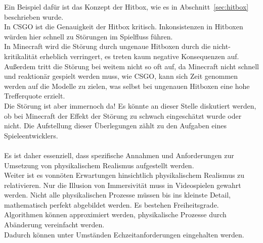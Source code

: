 Ein Beispiel dafür ist das Konzept der Hitbox, wie es in Abschnitt~\ref{sec:hitbox} beschrieben wurde.\\
In CSGO ist die Genauigkeit der Hitbox kritisch. Inkonsistenzen in Hitboxen würden hier schnell zu Störungen im Spielfluss führen.\\
In Minecraft wird die Störung durch ungenaue Hitboxen durch die nicht-kritikalität erheblich verringert, es treten kaum negative Konsequenzen auf. Außerdem tritt die Störung bei weitem nicht so oft auf, da Minecraft nicht schnell und reaktionär gespielt werden muss, wie CSGO, kann sich Zeit genommen werden auf die Modelle zu zielen, was selbst bei ungenauen Hitboxen eine hohe Trefferquote erzielt.\\
Die Störung ist aber immernoch da! Es könnte an dieser Stelle diskutiert werden, ob bei Minecraft der Effekt der Störung zu schwach eingeschätzt wurde oder nicht. Die Aufstellung dieser Überlegungen zählt zu den Aufgaben eines Spieleentwicklers.\\
\\
Es ist daher essenziell, dass spezifische Annahmen und Anforderungen zur Umsetzung von physikalischem Realismus aufgestellt werden.\\
Weiter ist es vonnöten Erwartungen hinsichtlich physikalischem Realismus zu relativieren. Nur die Illusion von Immersivität muss in Videospielen gewahrt werden. Nicht alle physikalischen Prozesse müssen bis ins kleinste Detail, mathematisch perfekt abgebildet werden. Es bestehen Freiheitsgrade. Algorithmen können approximiert werden, physikalische Prozesse durch Abänderung vereinfacht werden.\\
Dadurch können unter Umständen Echzeitanforderungen eingehalten werden.


